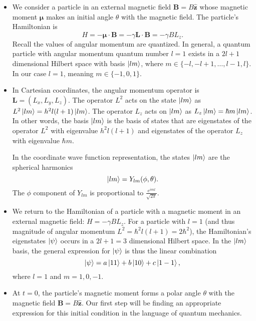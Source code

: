 \documentclass[11pt, a4paper]{article}
\renewcommand{\vec}[1]{\bm{#1}} %
\newcommand{\uvec}[1]{\hat{\vec{#1}}} %
\newcommand{\m}{\vec{\mu}}  %
\begin{document}
\begin{itemize}
	\item We consider a particle in an external magnetic field $ \vec{B} = B\uvec{z} $ whose magnetic moment $ \vec{\mu} $ makes an initial angle $ \theta $ with the magnetic field. The particle's Hamiltonian is
	\begin{equation*}
		H = - \m \cdot \vec{B} = - \gamma \vec{L} \cdot \vec{B} = - \gamma B L_{z}.
	\end{equation*}
	Recall the values of angular momentum are quantized. In general, a quantum particle with angular momentum quantum number $ l = 1 $ exists in a $ 2l + 1 $ dimensional Hilbert space with basis $ \ket{lm} $, where $ m \in \{-l, -l+1, \ldots, l-1, l\}  $. In our case $ l = 1 $, meaning $ m \in \{-1, 0, 1\} $.
	
	\item In Cartesian coordinates, the angular momentum operator is $ \vec{L} = (L_{x}, L_{y}, L_{z}) $. The operator $ L^{2} $ acts on the state $ \ket{lm} $ as $ L^{2}\ket{lm} = h^{2}l(l+1) \ket{lm}$. The operator $ L_{z} $ acts on $ \ket{lm} $ as $ L_{z} \ket{lm} = \hbar m \ket{lm} $. In other words, the basis $ \ket{lm} $ is the basis of states that are eigenstates of the operator $ L^{2} $ with eigenvalue $ h^{2}l(l+1) $ and eigenstates of the operator $ L_{z} $ with eigenvalue $ \hbar m $. 
	
	In the coordinate wave function representation, the states $ \ket{lm} $ are the spherical harmonics
	\begin{equation*}
		\ket{lm} = Y_{lm}(\phi, \theta).
	\end{equation*}
	The $ \phi $ component of $ Y_{lm} $ is proportional to $ \frac{e^{iml}}{\sqrt{2\pi}} $. 
	
	\item We return to the Hamiltonian of a particle with a magnetic moment in an external magnetic field: $ H = -\gamma BL_{z} $. For a particle with $ l = 1 $ (and thus magnitude of angular momentum $ L^{2} = \hbar^{2}l (l+1) = 2\hbar^{2} $), the Hamiltonian's eigenstates $ \ket{\psi} $ occurs in a $ 2l + 1 = 3 $ dimensional Hilbert space. In the $ \ket{lm} $ basis, the general expression for $ \ket{\psi} $ is thus the linear combination
	\begin{equation*}
		\ket{\psi} = a \ket{11} + b \ket{10} + c \ket{1 -1},
	\end{equation*}
	where $ l = 1 $ and $ m = 1, 0, -1 $. 
	
	\item At $ t = 0 $, the particle's magnetic moment forms a polar angle $ \theta $ with the magnetic field $ \vec{B} = B \uvec{z} $. Our first step will be finding an appropriate expression for this initial condition in the language of quantum mechanics.
\end{itemize}
\end{document}
